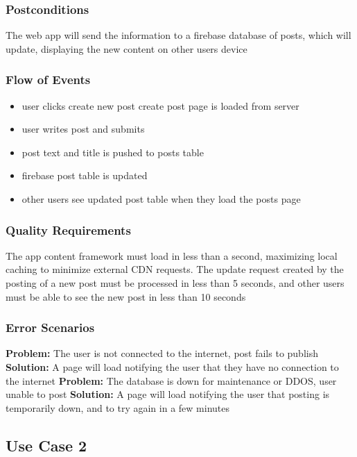 \documentclass[12pt]{article}
\begin{document}
\subsubsection{Postconditions}
The web app will send the information to a firebase database of posts, which will update, displaying the new content on other users device

\subsubsection{Flow of Events}
\begin{itemize}
  \item user clicks create new post create post page is loaded from server
  \item user writes post and submits
  \item post text and title is pushed to posts table
  \item firebase post table is updated
  \item other users see updated post table when they load the posts page
\end{itemize}

\subsubsection{Quality Requirements}
The app content framework must load in less than a second, maximizing local caching to minimize external CDN requests.
The update request created by the posting of a new post must be processed in less than 5 seconds, and other users must be able to see the new post in less than 10 seconds


\subsubsection{Error Scenarios}
\textbf{Problem:}
 The user is not connected to the internet, post fails to publish
\textbf{Solution:}
  A page will load notifying the user that they have no connection to the internet
\textbf{Problem:}
  The database is down for maintenance or DDOS, user unable to post
\textbf{Solution:}
  A page will load notifying the user that posting is temporarily down, and to try again in a few minutes

\subsection{Use Case 2}
\end{document}
